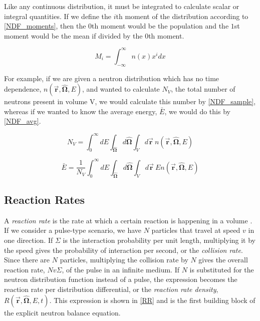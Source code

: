 Like any continuous distribution, it must be integrated to calculate scalar or integral quantities.  If we define the $i$th moment of the distribution according to \eqref{NDF_moments}, then the $0$th moment would be the population and the $1$st moment would be the mean if divided by the $0$th moment.

\begin{equation}
\label{NDF_moments}
M_i = \int_{-\infty}^{\infty} n(x)  x^{i} dx
\end{equation}

For example, if we are given a neutron distribution which has no time dependence, $n(\boldsymbol{\vec{r}},\boldsymbol{\hat{\Omega}},E)$, and wanted to calculate $N_V$, the total number of neutrons present in volume V, we would calculate this number by \eqref{NDF_sample}, whereas if we wanted to know the average energy, $\bar{E}$, we would do this by \eqref{NDF_avg}.

\begin{equation}
\label{NDF_sample}
N_V = \int_0^\infty dE \int_{\boldsymbol{\hat{\Omega}}} d\boldsymbol{\hat{\Omega}}  \int_{V} d\boldsymbol{\vec{r}} \: n(\boldsymbol{\vec{r}},\boldsymbol{\hat{\Omega}},E)  
\end{equation}

\begin{equation}
\label{NDF_avg}
\bar{E} = \frac{1}{N_V } \int_0^\infty dE \int_{\boldsymbol{\hat{\Omega}}} d\boldsymbol{\hat{\Omega}}  \int_{V} d\boldsymbol{\vec{r}} \: E n(\boldsymbol{\vec{r}},\boldsymbol{\hat{\Omega}},E) 
\end{equation}

\subsection{Reaction Rates}

A \emph{reaction rate} is the rate at which a certain reaction is happening in a volume \cite{duderstadt}.  If we consider a pulse-type scenario, we have $N$ particles that travel at speed $v$ in one direction.  If $\Sigma$ is the interaction probability per unit length, multiplying it by the speed gives the probability of interaction per second, or the \emph{collision rate}.  Since there are $N$ particles, multiplying the collision rate by $N$ gives the overall reaction rate, $N v \Sigma$, of the pulse in an infinite medium.  If $N$ is substituted for the neutron distribution function instead of a pulse, the expression becomes the reaction rate per distribution differential, or the \emph{reaction rate density}, $R(\boldsymbol{\vec{r}},\boldsymbol{\hat{\Omega}},E,t)$.  This expression is shown in \eqref{RR} and is the first building block of the explicit neutron balance equation.

